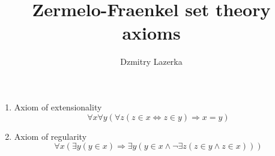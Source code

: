\documentclass{article}
\title{Zermelo-Fraenkel set theory axioms}
\author{Dzmitry Lazerka}
\begin{document}
\begin{enumerate}
\item
Axiom of extensionality
$$
\forall x \forall y (\forall z (z \in x \Leftrightarrow z \in y)
\Rightarrow x = y)
$$

\item
Axiom of regularity
$$
\forall x (\exists y (y \in x) \Rightarrow \exists y (y \in x \wedge
\neg \exists z (z \in y \wedge z \in x)))
$$

\end{enumerate}
\end{document}
